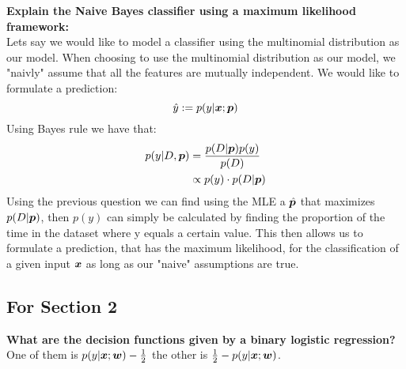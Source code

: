 \begin{appendices}
\begin{question}
    \textbf{Explain the Naive Bayes classifier using a maximum likelihood framework:}\\
    Lets say we would like to model a classifier using the multinomial distribution as our model. When choosing to use the multinomial distribution as our model, we "naivly" assume that all the features are mutually independent. We would like to formulate a prediction:
    \begin{equation}
        \hat{y} := p(y|\bm{x};\bm{p})
    \end{equation}
    Using Bayes rule we have that:
    \begin{align}
        p(y|D, \bm{p}) &{} = \frac{p(D | \bm{p}) p(y)}{p(D)} \\
        & \propto p(y) \cdot p(D | \bm{p})
    \end{align}
    Using the previous question we can find using the MLE a $\hat{\bm{p}}$ that maximizes $p(D | \bm{p})$, then $p(y)$ can simply be calculated by finding the proportion of the time in the dataset where y equals a certain value. This then allows us to formulate a prediction, that has the maximum likelihood, for the classification of a given input $\bm{x}$ as long as our "naive" assumptions are true. 
\end{question}


\subsection{For Section 2}

\begin{question}
    \textbf{What are the decision functions given by a binary logistic regression?} \\
    One of them is $p(y|\bm{x};\bm{w})-\frac{1}{2}$ the other is $\frac{1}{2} -p(y|\bm{x};\bm{w})$.
\end{question}


\end{appendices}
